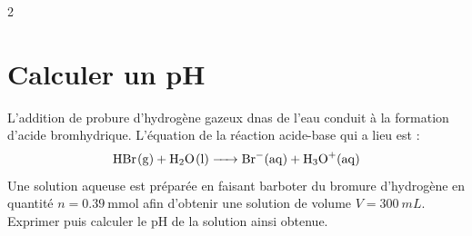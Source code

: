 \documentclass[a4paper,11pt,fleqn]{scrartcl}%
\begin{document}
\begin{multicols}{2}
\section{Calculer un pH}
L'addition de probure d'hydrogène gazeux  dnas de l'eau conduit à la formation d'acide bromhydrique. L'équation de la réaction acide-base qui a lieu est : 
$$ \ce{HBr(g) + H2O(l) -> Br-(aq) + H3O+(aq)}$$
Une solution aqueuse est préparée en faisant barboter du bromure d'hydrogène en quantité $n=\SI{0,39}{\milli\mole}$ afin d'obtenir une solution de volume $V=\SI{300}{mL}$.\\
Exprimer puis calculer le pH de la solution ainsi obtenue.

\end{multicols}
\end{document}
